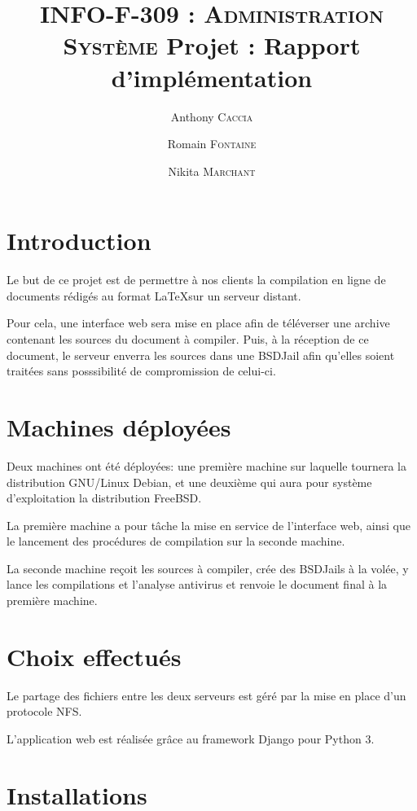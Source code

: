 \documentclass[10pt,a4paper]{article}
\author{Anthony \textsc{Caccia} \and Romain \textsc{Fontaine} \and Nikita \textsc{Marchant} }
\date{}
\title{\textsc{INFO-F-309 : Administration Système} Projet : Rapport d'implémentation}
\begin{document}
\maketitle

\section{Introduction}
\label{sec:Introduction}

Le but de ce projet est de permettre à nos clients la compilation en ligne de documents rédigés au format \LaTeX sur un serveur distant.

Pour cela, une interface web sera mise en place afin de téléverser une archive contenant les sources du document à compiler. Puis, à la réception de ce document, le serveur enverra les sources dans une BSDJail afin qu'elles soient traitées sans posssibilité de compromission de celui-ci.

\section{Machines déployées}
\label{sec:Machines déployées}

Deux machines ont été déployées: une première machine sur laquelle tournera la distribution GNU/Linux Debian, et une deuxième qui aura pour système d'exploitation la distribution FreeBSD.

La première machine a pour tâche la mise en service de l'interface web, ainsi que le lancement des procédures de compilation sur la seconde machine.

La seconde machine reçoit les sources à compiler, crée des BSDJails à la volée, y lance les compilations et l'analyse antivirus et renvoie le document final à la première machine.

\section{Choix effectués}
\label{sec:Choix effectués}

Le partage des fichiers entre les deux serveurs est géré par la mise en place d'un protocole NFS.

L'application web est réalisée grâce au framework Django pour Python 3.

\section{Installations}
\label{sec:Installations}
\end{document}
